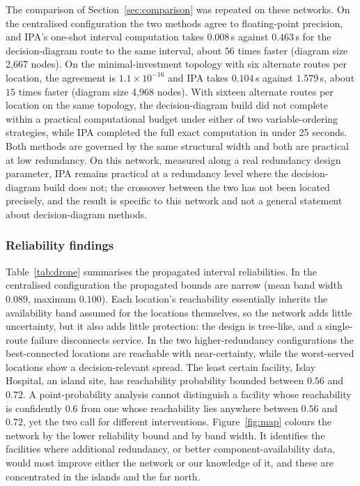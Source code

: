 \documentclass[preprint,12pt]{elsarticle}
\begin{document}
The comparison of Section~\ref{sec:comparison} was repeated on these networks. On the centralised configuration the two methods agree to floating-point precision, and IPA's one-shot interval computation takes $0.008$\,s against $0.463$\,s for the decision-diagram route to the same interval, about $56$ times faster (diagram size 2{,}667 nodes). On the minimal-investment topology with six alternate routes per location, the agreement is $1.1\times10^{-16}$ and IPA takes $0.104$\,s against $1.579$\,s, about $15$ times faster (diagram size 4{,}968 nodes). With sixteen alternate routes per location on the same topology, the decision-diagram build did not complete within a practical computational budget under either of two variable-ordering strategies, while IPA completed the full exact computation in under 25 seconds. Both methods are governed by the same structural width and both are practical at low redundancy. On this network, measured along a real redundancy design parameter, IPA remains practical at a redundancy level where the decision-diagram build does not; the crossover between the two has not been located precisely, and the result is specific to this network and not a general statement about decision-diagram methods.

\subsubsection{Reliability findings}\label{sec:findings}

Table~\ref{tab:drone} summarises the propagated interval reliabilities. In the centralised configuration the propagated bounds are narrow (mean band width $0.089$, maximum $0.100$). Each location's reachability essentially inherits the availability band assumed for the locations themselves, so the network adds little uncertainty, but it also adds little protection: the design is tree-like, and a single-route failure disconnects service. In the two higher-redundancy configurations the best-connected locations are reachable with near-certainty, while the worst-served locations show a decision-relevant spread. The least certain facility, Islay Hospital, an island site, has reachability probability bounded between $0.56$ and $0.72$. A point-probability analysis cannot distinguish a facility whose reachability is confidently $0.6$ from one whose reachability lies anywhere between $0.56$ and $0.72$, yet the two call for different interventions. Figure~\ref{fig:map} colours the network by the lower reliability bound and by band width. It identifies the facilities where additional redundancy, or better component-availability data, would most improve either the network or our knowledge of it, and these are concentrated in the islands and the far north.
\end{document}
